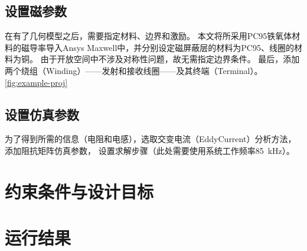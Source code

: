 \documentclass[index]{subfiles}
\begin{document}
\subsection{设置磁参数}
在有了几何模型之后，需要指定材料、边界和激励。
本文将所采用PC95铁氧体材料的磁导率导入Ansys Maxwell中，并分别设定磁屏蔽层的材料为PC95、线圈的材料为铜。
由于开放空间中不涉及对称性问题，故无需指定边界条件。
最后，添加两个绕组（Winding）——发射和接收线圈——及其终端（Terminal）。
\cref{fig:example-proj}

\subsection{设置仿真参数}
为了得到所需的信息（电阻和电感），选取交变电流（EddyCurrent）分析方法，添加阻抗矩阵仿真参数，
设置求解步骤（此处需要使用系统工作频率\SI{85}{\kilo\hertz}）。

\section{约束条件与设计目标}
\section{运行结果}
\end{document}
